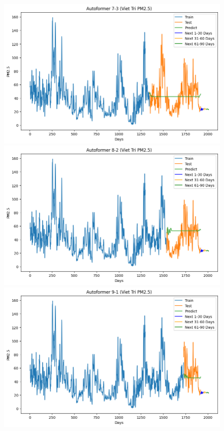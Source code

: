 \begin{figure}[H]
{\begin{adjustbox}{minipage=0.48\textwidth}
\begin{minipage}{0.3\textwidth}
            \end{minipage}\hfill
            \begin{minipage}{0.3\textwidth}
                \centering
                \includegraphics[width=\textwidth]{img/final/Autoformer/90D/Autoformer_7_3_VT.png}\\
                \includegraphics[width=\textwidth]{img/final/Autoformer/90D/Autoformer_8_2_VT.png}\\
                \includegraphics[width=\textwidth]{img/final/Autoformer/90D/Autoformer_9_1_VT.png}
            \end{minipage}
        \end{adjustbox}
    }


\end{figure}
